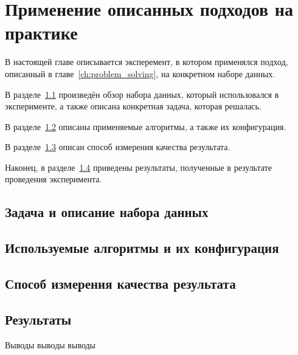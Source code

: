 \chapter{Применение описанных подходов на практике}

В настоящей главе описывается эксперемент, в котором применялся
подход, описанный в главе~\ref{ch:problem_solving}, на
конкретном наборе данных.

В разделе~\ref{sec:dataset} произведён обзор набора данных,
который использовался в эксперименте, а также описана
конкретная задача, которая решалась.

В разделе~\ref{sec:algorithms_config} описаны применяемые
алгоритмы, а также их конфигурация.

В разделе~\ref{sec:result_quality} описан способ измерения
качества результата.

Наконец, в разделе~\ref{sec:results} приведены результаты,
полученные в результате проведения эксперимента.

\section{Задача и описание набора данных}
\label{sec:dataset}

\section{Используемые алгоритмы и их конфигурация}
\label{sec:algorithms_config}

\section{Способ измерения качества результата}
\label{sec:result_quality}

\section{Результаты}
\label{sec:results}

\chapterconclusion

Выводы выводы выводы
